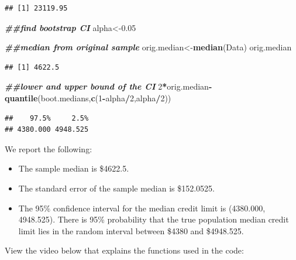 \documentclass[
]{book}
\newenvironment{Shaded}{\begin{snugshade}}{\end{snugshade}}
\newcommand{\DecValTok}[1]{\textcolor[rgb]{0.00,0.00,0.81}{#1}}
\newcommand{\DocumentationTok}[1]{\textcolor[rgb]{0.56,0.35,0.01}{\textbf{\textit{#1}}}}
\newcommand{\FloatTok}[1]{\textcolor[rgb]{0.00,0.00,0.81}{#1}}
\newcommand{\FunctionTok}[1]{\textcolor[rgb]{0.13,0.29,0.53}{\textbf{#1}}}
\newcommand{\NormalTok}[1]{#1}
\newcommand{\OtherTok}[1]{\textcolor[rgb]{0.56,0.35,0.01}{#1}}
\newcommand{\SpecialCharTok}[1]{\textcolor[rgb]{0.81,0.36,0.00}{\textbf{#1}}}
\providecommand{\tightlist}{%
  \setlength{\itemsep}{0pt}\setlength{\parskip}{0pt}}
\begin{document}
\begin{verbatim}
## [1] 23119.95
\end{verbatim}

\begin{Shaded}
\begin{Highlighting}[]
\DocumentationTok{\#\#find bootstrap CI}
\NormalTok{alpha}\OtherTok{\textless{}{-}}\FloatTok{0.05}

\DocumentationTok{\#\#median from original sample}
\NormalTok{orig.median}\OtherTok{\textless{}{-}}\FunctionTok{median}\NormalTok{(Data)}
\NormalTok{orig.median}
\end{Highlighting}
\end{Shaded}

\begin{verbatim}
## [1] 4622.5
\end{verbatim}

\begin{Shaded}
\begin{Highlighting}[]
\DocumentationTok{\#\#lower and upper bound of the CI}
\DecValTok{2}\SpecialCharTok{*}\NormalTok{orig.median}\SpecialCharTok{{-}}\FunctionTok{quantile}\NormalTok{(boot.medians,}\FunctionTok{c}\NormalTok{(}\DecValTok{1}\SpecialCharTok{{-}}\NormalTok{alpha}\SpecialCharTok{/}\DecValTok{2}\NormalTok{,alpha}\SpecialCharTok{/}\DecValTok{2}\NormalTok{))}
\end{Highlighting}
\end{Shaded}

\begin{verbatim}
##    97.5%     2.5% 
## 4380.000 4948.525
\end{verbatim}

We report the following:

\begin{itemize}
\tightlist
\item
  The sample median is \$4622.5.
\item
  The standard error of the sample median is \$152.0525.
\item
  The 95\% confidence interval for the median credit limit is (4380.000, 4948.525). There is 95\% probability that the true population median credit limit lies in the random interval between \$4380 and \$4948.525.
\end{itemize}

View the video below that explains the functions used in the code:

  
\end{document}
